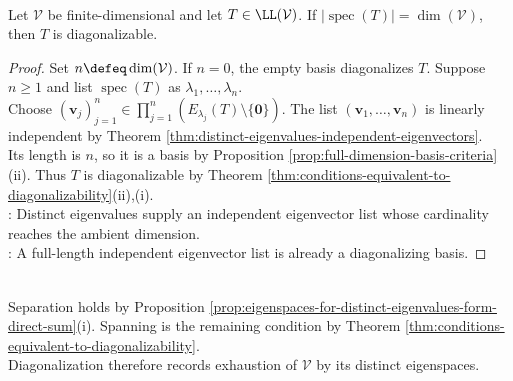 \begin{corollary} \label{cor:enough-eigenvalues-implies-diagonalizable} \\
Let $\mathcal{V}$ be finite-dimensional and let $T\in\LL(\mathcal{V})$. If $\lvert\operatorname{spec}(T)\rvert=\dim(\mathcal{V})$, then $T$ is diagonalizable.
\begin{proof}
Set $n\defeq\dim(\mathcal{V})$. If $n=0$, the empty basis diagonalizes $T$. Suppose $n\geq1$ and list $\operatorname{spec}(T)$ as $\lambda_1,\ldots,\lambda_n$.\\
Choose $(\mathbf{v}_j)_{j=1}^{n}\in\prod\limits_{j=1}^{n}(E_{\lambda_j}(T)\setminus\{\mathbf{0}\})$. The list $(\mathbf{v}_1,\ldots,\mathbf{v}_n)$ is linearly independent by Theorem \ref{thm:distinct-eigenvalues-independent-eigenvectors}.\\
Its length is $n$, so it is a basis by Proposition \ref{prop:full-dimension-basis-criteria}(ii). Thus $T$ is diagonalizable by Theorem \ref{thm:conditions-equivalent-to-diagonalizability}(ii),(i).\\
: Distinct eigenvalues supply an independent eigenvector list whose cardinality reaches the ambient dimension.\\
: A full-length independent eigenvector list is already a diagonalizing basis.
\end{proof}
\end{corollary}

\begin{perspective} \label{per:diagonalizability-viewpoint} \\
Separation holds by Proposition \ref{prop:eigenspaces-for-distinct-eigenvalues-form-direct-sum}(i). Spanning is the remaining condition by Theorem \ref{thm:conditions-equivalent-to-diagonalizability}.\\
Diagonalization therefore records exhaustion of $\mathcal{V}$ by its distinct eigenspaces.
\end{perspective}


